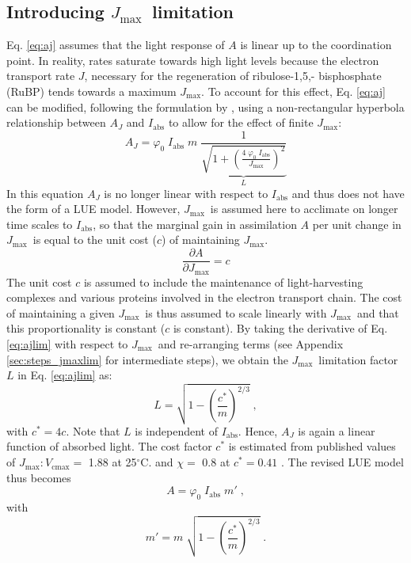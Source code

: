 \documentclass[gmd, manuscript]{copernicus}
\newcommand{\vcmax}{$V_{\text{cmax}}$}
\newcommand{\jmax}{$J_{\text{max}}$}
\begin{document}
\subsection{Introducing \jmax\ limitation}
\label{sec:jmax}
Eq. \ref{eq:aj} assumes that the light response of $A$ is linear up to the coordination point. In reality, rates saturate towards high light levels because the electron transport rate $J$, necessary for the regeneration of ribulose-1,5,- bisphosphate (RuBP) tends towards a maximum \jmax . To account for this effect, Eq. \ref{eq:aj} can be modified, following the formulation by \citet{smith37}, using a non-rectangular hyperbola relationship between $A_J$ and $I_{\mathrm{abs}}$ to allow for the effect of finite $J_{\mathrm{max}}$:
\begin{equation}
\label{eq:ajlim}
    A_J = \varphi_0 \; I_{\mathrm{abs}} \; m \; \underbrace{ \frac{1}{\sqrt{1+ \left( \frac{4\;\varphi_0\;I_{\mathrm{abs}}}{J_{\mathrm{max}}} \right)^{2}}} }_{L}
\end{equation}
In this equation $A_J$ is no longer linear with respect to $I_{\mathrm{abs}}$ and thus does not have the form of a LUE model. However, \jmax\ is assumed here to acclimate on longer time scales to $I_{\mathrm{abs}}$, so that the marginal gain in assimilation $A$ per unit change in \jmax\ is equal to the unit cost ($c$) of maintaining \jmax .
\begin{equation}
\label{eq:jmaxpartial}
    \frac{\partial A}{\partial J_{\mathrm{max}}} = c 
\end{equation}
The unit cost $c$ is assumed to include the maintenance of light-harvesting complexes and various proteins involved in the electron transport chain. The cost of maintaining a given \jmax\ is thus assumed to scale linearly with \jmax\ and that this proportionality is constant ($c$ is constant). By taking the derivative of Eq. \ref{eq:ajlim} with respect to \jmax\ and re-arranging terms (see Appendix \ref{sec:steps_jmaxlim} for intermediate steps), we obtain the \jmax\ limitation factor $L$ in Eq. \ref{eq:ajlim} as:
\begin{equation}
\label{eq:factor_jmaxlim}
    L = \sqrt{ 1 - \left( \frac{c^\ast}{m} \right)^{2/3} }\;,
\end{equation}
with $c^\ast = 4c$. Note that $L$ is independent of $I_\text{abs}$. Hence, $A_J$ is again a linear function of absorbed light. The cost factor $c^\ast$ is estimated from published values of \jmax $:$\vcmax $=$ 1.88 at 25$^\circ$C. \citep{kattge07} and $\chi =$ 0.8 \citep{lloyd94} at $c^\ast = 0.41$ \citep{wang17natpl}. The revised LUE model thus becomes
\begin{equation}
\label{eq:ajlim4}
    A = \varphi_0 \; I_{\mathrm{abs}} \; m' \;,
\end{equation}
with
\begin{equation}
\label{eq:mprime}
    m' = m \; \sqrt{1 - \left( \frac{c^\ast}{m} \right)^{2/3} } \;.
\end{equation}
\end{document}
